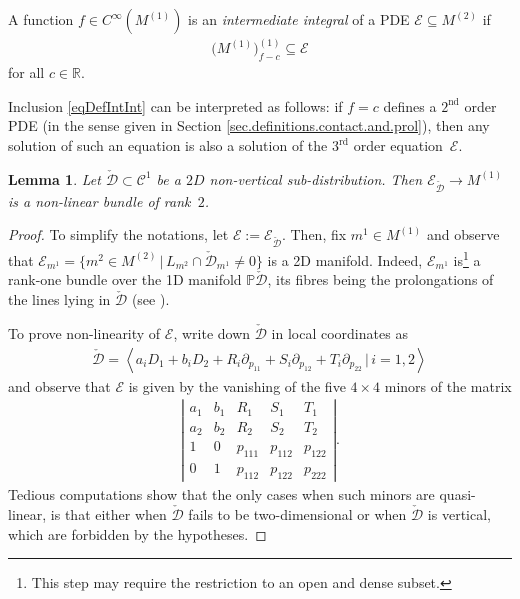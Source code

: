 \documentclass[pdftex]{sigma}
\newcommand{\R}{\mathbb{R}}
\newcommand{\C}{\mathcal{C}}
\newcommand{\E}{\mathcal{E}}
\newcommand{\Span}[1]{\left\langle #1 \right\rangle}
\renewcommand{\P}{\mathbb{P}}
\newcommand{\Rd}{^\textrm{rd}}
\newcommand{\Nd}{^\textrm{nd}}
\newcommand{\Ddue}{{\check{\mathcal{D}}}}
\numberwithin{equation}{section}
\newtheorem{Lemma}[Theorem]{Lemma}
\begin{document}
\begin{Definition}
A function $f\in C^\infty(M^{(1)})$ is an \emph{intermediate integral} of a PDE $\E\subseteq M^{(2)}$ if
 \begin{gather}\label{eqDefIntInt}
\big(M^{(1)}\big)_{f-c}^{(1)}\subseteq\E
\end{gather}
for all $c\in\R$.
\end{Definition}

Inclusion \eqref{eqDefIntInt} can be interpreted as follows: if $f=c$ def\/ines a $2\Nd$ order PDE (in the sense given in Section \ref{sec.definitions.contact.and.prol}), then any solution of such an equation is also a solution of the $3\Rd$ order equation~$\E$.

\begin{Lemma}\label{LemmaPartoritoConTantaSofferenza}
 Let $\Ddue\subset\C^1$ be a $2D$ non-vertical
 sub-distribution.
 Then $\E_\Ddue\longrightarrow M^{(1)}$ is a non-linear bundle of rank~$2$.
\end{Lemma}

\begin{proof}
To simplify the notations, let $\E:=\E_\Ddue$. Then,
f\/ix $m^1\in M^{(1)}$ and observe that
$
\E_{m^1}=\{m^2\in M^{(2)}\,|\, L_{m^2}\cap\Ddue_{m^1} \neq 0\}
$
is a 2D manifold. Indeed, $\E_{m^1}$ is\footnote{This step may require the restriction to an open and dense subset.} a rank-one bundle over the 1D manifold $\P\Ddue$, its f\/ibres being the prolongations of the lines lying in $\Ddue$ (see \cite[Proposition 2.5]{MR1670044}).

To prove non-linearity of $\E$, write down $\Ddue$ in local coordinates as
\begin{gather*}
\Ddue=\Span{a_iD_1+b_iD_2+R_i\partial_{p_{11}}+S_i\partial_{p_{12}}+T_i\partial_{p_{22}}\,|\, i=1,2}
\end{gather*} and observe that $\E$ is given by the vanishing of the f\/ive $4\times 4$ minors of the matrix
\begin{gather*}
\left|\begin{matrix}a_1 & b_1 & R_1 & S_1 & T_1 \\a_2 & b_2 & R_2 & S_2 & T_2 \\1 & 0 & p_{111} & p_{112} & p_{122} \\0 & 1 & p_{112} & p_{122} & p_{222}\end{matrix}\right|.
\end{gather*}
Tedious  computations show that the only cases when such minors are quasi-linear, is that \mbox{either} when $\Ddue$ fails to be two-dimensional or when $\Ddue$ is vertical, which are forbidden by the hypo\-theses.
\end{proof}
\end{document}
